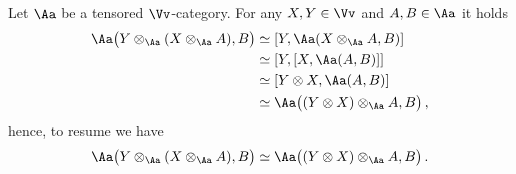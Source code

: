 \begin{rmk}
    Let $\Aa$ be a tensored $\Vv$-category.
    For any $X,Y \in \Vv$ and $A,B \in \Aa$ it holds
    \begin{align*}
        \Aa\big( Y \otimes_{\Aa} ( X \otimes_{\Aa} A) , B \big)
        &\simeq [Y,\Aa(X \otimes_{\Aa} A, B)] \\
        &\simeq [Y,[X,\Aa(A,B)]] \\
        &\simeq [Y \otimes X, \Aa(A,B)] \\
        &\simeq \Aa\big((Y \otimes X) \otimes_{\Aa} A, B\big)\,,
    \end{align*}
    hence, to resume we have
    \begin{equation*}
        \Aa\big( Y \otimes_{\Aa} ( X \otimes_{\Aa} A) , B \big)
        \simeq \Aa\big((Y \otimes X) \otimes_{\Aa} A, B\big)\,.
    \end{equation*}
\end{rmk}

